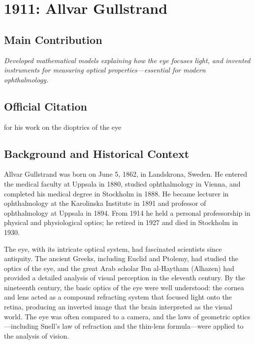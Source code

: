 \chapter[1911 --- Gullstrand]{1911: Allvar Gullstrand}
\label{ch:1911_allvargullstrand}

\section*{Main Contribution}

\textit{Developed mathematical models explaining how the eye focuses light, and invented instruments for measuring optical properties---essential for modern ophthalmology.}\cite{nobel-1911,lecture-1911}

\section{Official Citation}

for his work on the dioptrics of the eye

\section{Background and Historical Context}

Allvar Gullstrand was born on June 5, 1862, in Landskrona, Sweden. He entered the medical faculty at Uppsala in 1880, studied ophthalmology in Vienna, and completed his medical degree in Stockholm in 1888. He became lecturer in ophthalmology at the Karolinska Institute in 1891 and professor of ophthalmology at Uppsala in 1894. From 1914 he held a personal professorship in physical and physiological optics; he retired in 1927 and died in Stockholm in 1930.\cite{gullstrand-biographical}

The eye, with its intricate optical system, had fascinated scientists since antiquity. The ancient Greeks, including Euclid and Ptolemy, had studied the optics of the eye, and the great Arab scholar Ibn al-Haytham (Alhazen) had provided a detailed analysis of visual perception in the eleventh century. By the nineteenth century, the basic optics of the eye were well understood: the cornea and lens acted as a compound refracting system that focused light onto the retina, producing an inverted image that the brain interpreted as the visual world. The eye was often compared to a camera, and the laws of geometric optics---including Snell's law of refraction and the thin-lens formula---were applied to the analysis of vision.

